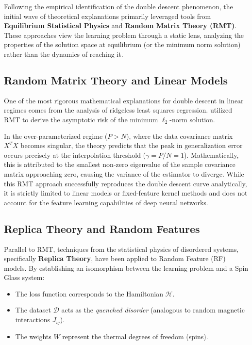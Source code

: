 \documentclass[
  journal=largetwo,
  year=2025,
  volume=37,
]{cup-journal}
\begin{document}
Following the empirical identification of the double descent phenomenon, the initial wave of theoretical explanations primarily leveraged tools from \textbf{Equilibrium Statistical Physics} and \textbf{Random Matrix Theory (RMT)}. These approaches view the learning problem through a static lens, analyzing the properties of the solution space at equilibrium (or the minimum norm solution) rather than the dynamics of reaching it.

\subsection{Random Matrix Theory and Linear Models}
One of the most rigorous mathematical explanations for double descent in linear regimes comes from the analysis of ridgeless least squares regression. \cite{hastie2019surprises} utilized RMT to derive the asymptotic risk of the minimum $\ell_2$-norm solution. 

In the over-parameterized regime ($P > N$), where the data covariance matrix $X^TX$ becomes singular, the theory predicts that the peak in generalization error occurs precisely at the interpolation threshold ($\gamma = P/N = 1$). Mathematically, this is attributed to the smallest non-zero eigenvalue of the sample covariance matrix approaching zero, causing the variance of the estimator to diverge. While this RMT approach successfully reproduces the double descent curve analytically, it is strictly limited to linear models or fixed-feature kernel methods and does not account for the feature learning capabilities of deep neural networks.

\subsection{Replica Theory and Random Features}
Parallel to RMT, techniques from the statistical physics of disordered systems, specifically \textbf{Replica Theory}, have been applied to Random Feature (RF) models. By establishing an isomorphism between the learning problem and a Spin Glass system:
\begin{itemize}
    \item The loss function corresponds to the Hamiltonian $\mathcal{H}$.
    \item The dataset $\mathcal{D}$ acts as the \textit{quenched disorder} (analogous to random magnetic interactions $J_{ij}$).
    \item The weights $W$ represent the thermal degrees of freedom (spins).
\end{itemize}
\end{document}
